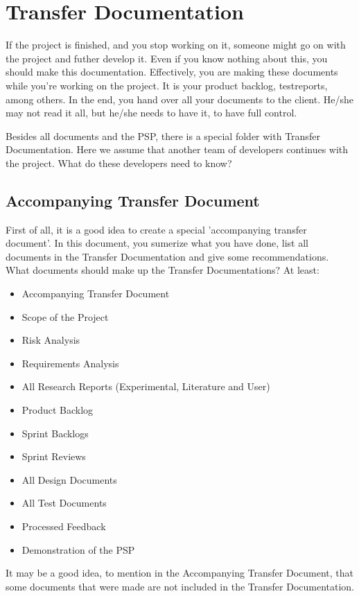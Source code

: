 \documentclass[10pt]{report}
\begin{document}
\section{Transfer Documentation}

If the project is finished, and you stop working on it, someone might go on with the project and futher develop it. Even if you know nothing about this, you should make this documentation. Effectively, you are making these documents while you're working on the project. It is your product backlog, testreports, among others. In the end, you hand over all your documents to the client. He/she may not read it all, but he/she needs to have it, to have full control. 

Besides all documents and the PSP, there is a special folder with Transfer Documentation. Here we assume that another team of developers continues with the project. What do these developers need to know?

\subsection{Accompanying Transfer Document}

 First of all, it is a good idea to create a special 'accompanying transfer document'. In this document, you sumerize what you have done, list all documents in the Transfer Documentation and give some recommendations. What documents should make up the Transfer Documentations? At least:

\begin{itemize}
	\item Accompanying Transfer Document
	\item Scope of the Project
	\item Risk Analysis
	\item Requirements Analysis
	\item All Research Reports (Experimental, Literature and User)
	\item Product Backlog
	\item Sprint Backlogs
	\item Sprint Reviews
	\item All Design Documents
	\item All Test Documents
	\item Processed Feedback
	\item Demonstration of the PSP
\end{itemize}

\noindent It may be a good idea, to mention in the Accompanying Transfer Document, that some documents that were made are not included in the Transfer Documentation.
\end{document}
